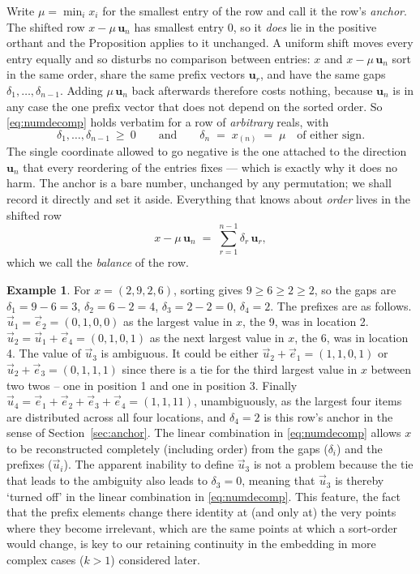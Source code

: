 \documentclass[11pt,a4paper]{article}
\theoremstyle{definition}
\newtheorem{example}[definition]{Example}
\theoremstyle{plain}
\newcommand{\bvec}[1]{\mathbf{#1}}
\begin{document}
Write $\mu=\min_i x_i$ for the smallest entry of the row and call it the row's
\emph{anchor}. The shifted row $x-\mu\,\bvec u_n$ has smallest entry $0$, so it
\emph{does} lie in the positive orthant and the Proposition applies to it
unchanged. A uniform shift moves every entry equally and so disturbs no
comparison between entries: $x$ and $x-\mu\,\bvec u_n$ sort in the same order,
share the same prefix vectors $\bvec u_r$, and have the same gaps
$\delta_1,\dots,\delta_{n-1}$. Adding $\mu\,\bvec u_n$ back afterwards
therefore costs nothing, because $\bvec u_n$ is in any case the one prefix
vector that does not depend on the sorted order.
So \eqref{eq:numdecomp} holds verbatim for a row of \emph{arbitrary} reals,
with
\[
   \delta_1,\dots,\delta_{n-1}\ \ge\ 0
   \qquad\text{and}\qquad
   \delta_n \;=\; x_{(n)} \;=\; \mu \quad\text{of either sign}.
\]
The single coordinate allowed to go negative is the one attached to the
direction $\bvec u_n$ that every reordering of the entries fixes --- which is
exactly why it does no harm. The anchor is a bare number, unchanged by any
permutation; we shall record it directly and set it aside. Everything that
knows about \emph{order} lives in the shifted row
\[
   x-\mu\,\bvec u_n \;=\; \sum_{r=1}^{n-1}\delta_r\,\bvec u_r ,
\]
which we call the \emph{balance} of the row.

\begin{example}\label{ex:numbers}
For $x=(2,9,2,6)$, sorting gives $9\ge6\ge2\ge2$, so the gaps are
$\delta_1=9{-}6=3$, $\delta_2=6{-}2=4$, $\delta_3=2{-}2=0$, $\delta_4=2$. The
prefixes are as follows.  $\vec u_1=\vec e_2=(0,1,0,0)$ as the largest value in $x$, the 9,  was in location 2.  $\vec u_2=\vec u_1 + \vec e_4 = (0,1,0,1)$ as the next largest value in $x$, the 6, was in location 4. The value of $\vec u_3$ is ambiguous. It could be either $\vec u_2+\vec e_1=(1,1,0,1)$ or $\vec u_2 + \vec e_3=(0,1,1,1)$ since there is a tie for the third largest value in $x$ between two twos -- one in position 1 and one in position 3. Finally $\vec u_4=\vec e_1+\vec e_2+\vec e_3 +\vec e_4=(1,1,11)$,  unambiguously, as the largest four items are distributed across all four locations, and $\delta_4=2$ is this row's anchor in the sense of Section~\ref{sec:anchor}.  The linear combination in \eqref{eq:numdecomp} allows $x$ to be reconstructed completely (including order) from the gaps ($\delta_i$) and the prefixes ($\vec u_i$).  The apparent inability to define $\vec u_3$ is not a problem because the tie that leads to the ambiguity also leads to $\delta_3=0$, meaning that $\vec u_3$ is thereby `turned off' in the linear combination in \eqref{eq:numdecomp}. This feature, the fact that the prefix elements change there identity at (and only at) the very points where they become irrelevant, which are the same points at which a sort-order would change, is key to our retaining continuity in the embedding in more complex cases ($k>1$) considered later.
\end{example}
\end{document}
